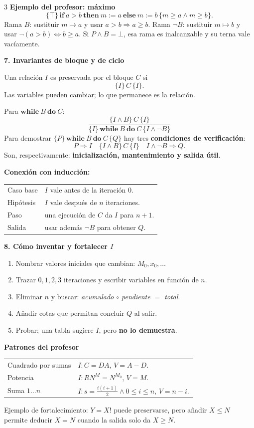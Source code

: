 \documentclass[10pt,letterpaper]{article}
\newcommand{\Htriple}[3]{\{#1\}\,#2\,\{#3\}}
\newcommand{\topic}[1]{%
  \vspace{1.0pt}\colorbox{azulclaro}{%
    \parbox{\dimexpr\linewidth-2\fboxsep\relax}{\color{azul}\bfseries #1}}\vspace{0.5pt}}
\newcommand{\alerta}[1]{\textcolor{rojo}{\bfseries #1}}
\begin{document}
\begin{multicols*}{3}
\textbf{Ejemplo del profesor: máximo}
\[
\Htriple{\top}{\mathbf{if}\ a>b\ \mathbf{then}\ m:=a\ \mathbf{else}\ m:=b}
{m\ge a\land m\ge b}.
\]
Rama $B$: sustituir $m\mapsto a$ y usar $a>b\Rightarrow a\ge b$.
Rama $\neg B$: sustituir $m\mapsto b$ y usar $\neg(a>b)\iff b\ge a$.
Si $P\land B=\bot$, esa rama es inalcanzable y su terna vale vacíamente.

\topic{7. Invariantes de bloque y de ciclo}

Una relación $I$ es preservada por el bloque $C$ si
\[
\boxed{\Htriple{I}{C}{I}}.
\]
Las variables pueden cambiar; lo que permanece es la relación.

Para $\mathbf{while}\ B\ \mathbf{do}\ C$:
\[
\boxed{
\frac{\Htriple{I\land B}{C}{I}}
     {\Htriple{I}{\mathbf{while}\ B\ \mathbf{do}\ C}{I\land\neg B}}}
\]
Para demostrar $\Htriple{P}{\mathbf{while}\ B\ \mathbf{do}\ C}{Q}$ hay tres
\textbf{condiciones de verificación}:
\[
\boxed{P\Rightarrow I}\quad
\boxed{\Htriple{I\land B}{C}{I}}\quad
\boxed{I\land\neg B\Rightarrow Q}.
\]
Son, respectivamente: \textbf{inicialización, mantenimiento y salida útil}.

\textbf{Conexión con inducción:}\par
\begin{tabularx}{\linewidth}{@{}l X@{}}
Caso base & $I$ vale antes de la iteración $0$.\\
Hipótesis & $I$ vale después de $n$ iteraciones.\\
Paso & una ejecución de $C$ da $I$ para $n+1$.\\
Salida & usar además $\neg B$ para obtener $Q$.\\
\end{tabularx}

\topic{8. Cómo inventar y fortalecer $I$}

\begin{enumerate}
  \item Nombrar valores iniciales que cambian: $M_0,x_0,\ldots$
  \item Trazar $0,1,2,3$ iteraciones y escribir variables en función de $n$.
  \item Eliminar $n$ y buscar: \emph{acumulado $\circ$ pendiente $=$ total}.
  \item Añadir cotas que permitan concluir $Q$ al salir.
  \item Probar; una tabla sugiere $I$, pero \alerta{no lo demuestra}.
\end{enumerate}

\textbf{Patrones del profesor}\par
\begin{tabularx}{\linewidth}{@{}l X@{}}
Cuadrado por sumas & $I:C=DA$, $V=A-D$.\\
Potencia & $I:RN^M=N^{M_0}$, $V=M$.\\
Suma $1\ldots n$ & $I:s=\frac{i(i+1)}2\land0\le i\le n$, $V=n-i$.\\
\end{tabularx}
Ejemplo de fortalecimiento: $Y=X!$ puede preservarse, pero añadir $X\le N$
permite deducir $X=N$ cuando la salida solo da $X\ge N$.


\end{multicols*}
\end{document}
